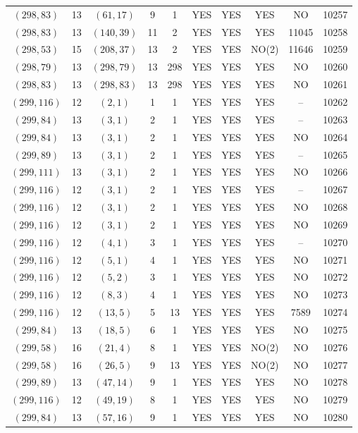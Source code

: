 \begin{longtable}{|c|c|c|c|c|c|c|c|c|c|}
$(298, 83)$ & 13 & $(61, 17)$ & 9 & 1 & YES & YES & YES & NO & 10257\\
$(298, 83)$ & 13 & $(140, 39)$ & 11 & 2 & YES & YES & YES & 11045 & 10258\\
$(298, 53)$ & 15 & $(208, 37)$ & 13 & 2 & YES & YES & NO(2) & 11646 & 10259\\
$(298, 79)$ & 13 & $(298, 79)$ & 13 & 298 & YES & YES & YES & NO & 10260\\
$(298, 83)$ & 13 & $(298, 83)$ & 13 & 298 & YES & YES & YES & NO & 10261\\
$(299, 116)$ & 12 & $(2, 1)$ & 1 & 1 & YES & YES & YES & -- & 10262\\
$(299, 84)$ & 13 & $(3, 1)$ & 2 & 1 & YES & YES & YES & -- & 10263\\
$(299, 84)$ & 13 & $(3, 1)$ & 2 & 1 & YES & YES & YES & NO & 10264\\
$(299, 89)$ & 13 & $(3, 1)$ & 2 & 1 & YES & YES & YES & -- & 10265\\
$(299, 111)$ & 13 & $(3, 1)$ & 2 & 1 & YES & YES & YES & NO & 10266\\
$(299, 116)$ & 12 & $(3, 1)$ & 2 & 1 & YES & YES & YES & -- & 10267\\
$(299, 116)$ & 12 & $(3, 1)$ & 2 & 1 & YES & YES & YES & NO & 10268\\
$(299, 116)$ & 12 & $(3, 1)$ & 2 & 1 & YES & YES & YES & NO & 10269\\
$(299, 116)$ & 12 & $(4, 1)$ & 3 & 1 & YES & YES & YES & -- & 10270\\
$(299, 116)$ & 12 & $(5, 1)$ & 4 & 1 & YES & YES & YES & NO & 10271\\
$(299, 116)$ & 12 & $(5, 2)$ & 3 & 1 & YES & YES & YES & NO & 10272\\
$(299, 116)$ & 12 & $(8, 3)$ & 4 & 1 & YES & YES & YES & NO & 10273\\
$(299, 116)$ & 12 & $(13, 5)$ & 5 & 13 & YES & YES & YES & 7589 & 10274\\
$(299, 84)$ & 13 & $(18, 5)$ & 6 & 1 & YES & YES & YES & NO & 10275\\
$(299, 58)$ & 16 & $(21, 4)$ & 8 & 1 & YES & YES & NO(2) & NO & 10276\\
$(299, 58)$ & 16 & $(26, 5)$ & 9 & 13 & YES & YES & NO(2) & NO & 10277\\
$(299, 89)$ & 13 & $(47, 14)$ & 9 & 1 & YES & YES & YES & NO & 10278\\
$(299, 116)$ & 12 & $(49, 19)$ & 8 & 1 & YES & YES & YES & NO & 10279\\
$(299, 84)$ & 13 & $(57, 16)$ & 9 & 1 & YES & YES & YES & NO & 10280\\

\end{longtable}
